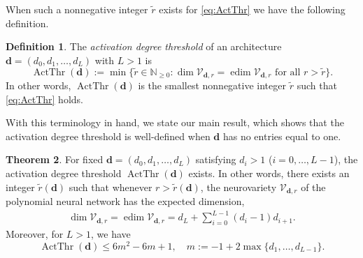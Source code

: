 \documentclass[12pt]{article}
\theoremstyle{definition}
\newtheorem{theorem}{Theorem}
\newtheorem{definition}[theorem]{Definition}
\DeclareMathOperator{\ActThr}{ActThr}
\newcommand{\bfd}{\mathbf{d}}
\newcommand{\upperboundn}[1]{6{#1}^2-6#1+1}
\newcommand{\demph}[1]{\emph{{\color{RoyalBlue}#1}}}
\newcommand{\repeattheorem}[2]{%
  \begingroup
  \renewcommand{\thetheorem}{\ref{#1}}%
  \addtocounter{theorem}{-1}%
  \begin{theorem}
  #2
  \end{theorem}
  \endgroup
}
\newcommand{\edim}[1]{\operatorname{edim}{#1}}
\renewcommand{\dim}[1]{\operatorname{dim}{#1}}
\begin{document}
When such a nonnegative integer $\tilde r$ exists for \eqref{eq:ActThr} we have the following definition.

\begin{definition}\label{def:adt}
The \demph{activation degree threshold} of an architecture $\mathbf{d} = (d_0,d_1,\dots,d_L)$ with $L>1$
    is 
    \[
\ActThr(\mathbf{d}):=\min\{ \tilde r\in \mathbb{N}_{\geq 0} : 
\dim{\mathcal{V}_{\mathbf{d},r}}=\edim{\mathcal{V}_{\mathbf{d},r}} \text{ for all } r>\tilde{r}
\}.    
    \]
    In other words, 
    $\ActThr(\mathbf{d})$ is
    the smallest {nonnegative integer} $\tilde{r}$ such that \eqref{eq:ActThr} holds.
\end{definition}

With this terminology in hand, we state our main result, which shows that the activation degree threshold is well-defined when $\bfd$ has no entries equal to one. 

\repeattheorem{theorem:high-degree}{
For fixed $\mathbf{d} = (d_0,d_1,\dotsc,d_L)$ satisfying $d_i>1$ ($i=0,\dotsc,L-1$),
the activation degree threshold $\ActThr(\mathbf{d})$ exists. 
In other words, there exists an integer $\tilde{r}(\bfd)$ such that whenever $r>\tilde{r}(\bfd)$, the neurovariety $\mathcal{V}_{\mathbf{d},r}$ of the polynomial neural network has the expected dimension, 
\begin{align*}
\dim{\mathcal{V}_{\mathbf{d},r}} = \edim{\mathcal{V}_{\mathbf{d},r}} = d_L + \sum_{i=0}^{L-1} (d_i-1)d_{i+1}.
\end{align*}
Moreover,
for $L>1$,
we have 
\begin{equation}
\ActThr(\mathbf{d}) \le 
\upperboundn{m},
\quad m:=-1+2\max\{d_1, \dots, d_{L-1}\} .
\end{equation}
}
\end{document}
